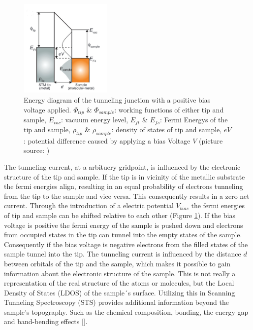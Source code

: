 \newpage
\begin{figure}
    \centering
    \includegraphics[width=0.4\textwidth]{graphics/Tunneling_diagram_japan.PNG}
    \caption{Energy diagram of the tunneling  junction with a positive bias voltage applied. $\Phi_{tip}$ \& $\Phi_{sample}$: working functions of either tip and sample, $E_{vac}$: vacuum energy level,  $E_{ft}$ \& $E_{fs}$: Fermi Energys of the tip and sample,  $\rho_{tip}$ \& $\rho_{sample}$: density of states of tip and sample,  $eV$: potential difference caused by applying a bias Voltage $V$ (picture source: \cite{Kano}) }
    \label{fig:energy_diagram}
\end{figure}

The tunneling current, at a arbituery gridpoint, is influenced by the electronic structure of the tip and sample.
If the tip is in vicinity of the metallic substrate the fermi energies align, resulting in an equal probability of electrons tunneling from the tip to the sample and vice versa.
This consequently results in a zero net current. 
Through the introduction of a electric potential $V_{bias}$ the fermi energies of tip and sample can be shifted relative to each other (Figure \ref{fig:energy_diagram}).
If the bias voltage is positive the fermi energy of the sample is pushed down and electrons from occupied states in the tip can tunnel into the empty states of the sample.
Consequently if the bias voltage is negative electrons from the filled states of the sample tunnel into the tip.
The tunneling current is influenced by the distance $d$ between orbitals of the tip and the sample, which makes it possible to gain information about the electronic structure of the sample.
This is not really a representation of the real structure of the atoms or molecules, but the Local Density of States (LDOS) of the sample´s surface.
Utilizing this in Scanning Tunneling Spectroscopy (STS) provides additional information beyond the sample's topography.
Such as the chemical composition, bonding, the energy gap and band-bending effects [\cite{cbai}].
\newpage

